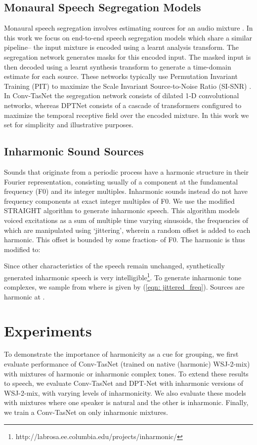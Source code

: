 \documentclass{article}
\begin{document}
\subsection{Monaural Speech Segregation Models}
\label{sec:Monaural Speech Separation Models}
Monaural speech segregation involves estimating  sources  for an audio mixture . In this work we focus on end-to-end speech segregation models \cite{luo2018tasnet} which share a similar pipeline-- the input mixture is encoded using a learnt analysis transform. The segregation network generates  masks for this encoded input. The masked input is then decoded using a learnt synthesis transform to generate a time-domain estimate for each source. These networks typically use Permutation Invariant Training (PIT) \cite{kolbaek2017multitalker} to maximize the Scale Invariant Source-to-Noise Ratio (SI-SNR) \cite{luo2018tasnet}.
In Conv-TasNet the segregation network consists of dilated 1-D convolutional networks, whereas  DPTNet consists of a cascade of transformers configured to maximize the temporal receptive field over the encoded mixture. In this work we set  for simplicity and illustrative purposes.

\subsection{Inharmonic Sound Sources}
\label{Inharmonic Sound Source}
Sounds that originate from a periodic process have a harmonic structure in their Fourier representation, consisting usually of a component at the fundamental frequency (F0) and its integer multiples.
Inharmonic sounds instead do not have frequency components at exact integer multiples of F0. We use the modified STRAIGHT algorithm \cite{ellis2012inharmonic} to generate inharmonic speech. This algorithm models voiced excitations as a sum of multiple time varying sinusoids, the frequencies of which are manipulated using `jittering', wherein a random offset is added to each harmonic. This offset is bounded by some fraction-  of F0. The  harmonic is thus modified to:
\vspace*{-2mm}

Since other characteristics of the speech remain unchanged, synthetically generated inharmonic speech is very intelligible\footnote{http://labrosa.ee.columbia.edu/projects/inharmonic/}. 
To generate inharmonic tone complexes, we sample from 
where  is given by (\ref{eqn: jittered_freq}). Sources are harmonic at .

\section{Experiments}
\label{sec:Experiments}
To demonstrate the importance of harmonicity as a cue for grouping, we first evaluate performance of Conv-TasNet (trained on native (harmonic) WSJ-2-mix) with mixtures of harmonic or inharmonic complex tones. To extend these results to speech, we evaluate Conv-TasNet and DPT-Net with inharmonic versions of WSJ-2-mix, with varying levels of inharmonicity. We also evaluate these models with mixtures where one speaker is natural and the other is inharmonic. Finally, we train a Conv-TasNet on only inharmonic mixtures.
\end{document}
